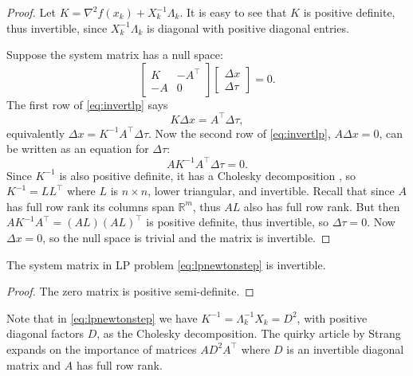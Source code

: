 \documentclass[11pt]{article}
\newcommand{\RR}{\mathbb{R}}
\newcommand{\grad}{\nabla}
\begin{document}
\begin{proof}  Let $K=\grad^2 f(x_k)+X_k^{-1}\Lambda_k$.  It is easy to see that $K$ is positive definite, thus invertible, since $X_k^{-1}\Lambda_k$ is diagonal with positive diagonal entries.

Suppose the system matrix has a null space:
\begin{equation}
\begin{bmatrix}
K   & -A^\top \\
-A  & 0
\end{bmatrix}
\begin{bmatrix}
\Delta x \\
\Delta \tau
\end{bmatrix}
= 0. \label{eq:invertlp}
\end{equation}
The first row of \eqref{eq:invertlp} says
    $$K \Delta x = A^\top \Delta\tau,$$
equivalently $\Delta x = K^{-1} A^\top \Delta \tau$.  Now the second row of \eqref{eq:invertlp}, $A\Delta x=0$, can be written as an equation for $\Delta\tau$:
    $$A K^{-1} A^\top \Delta \tau = 0.$$
Since $K^{-1}$ is also positive definite, it has a Cholesky decomposition \cite{TrefethenBau1997}, so $K^{-1}=LL^\top$ where $L$ is $n\times n$, lower triangular, and invertible.  Recall that since $A$ has full row rank its columns span $\RR^m$, thus $AL$ also has full row rank.  But then $A K^{-1} A^\top = (AL) (AL)^\top$ is positive definite, thus invertible, so $\Delta \tau=0$.  Now $\Delta x=0$, so the null space is trivial and the matrix is invertible. \end{proof}

\begin{corollary} The system matrix in LP problem \eqref{eq:lpnewtonstep} is invertible.
\end{corollary}

\begin{proof}  The zero matrix is positive semi-definite.  \end{proof}

Note that in \eqref{eq:lpnewtonstep} we have $K^{-1}=\Lambda_k^{-1} X_k=D^2$, with positive diagonal factors $D$, as the Cholesky decomposition.  The quirky article by Strang \cite{Strang1987} expands on the importance of matrices $A D^2 A^\top$ where $D$ is an invertible diagonal matrix and $A$ has full row rank.
\end{document}
